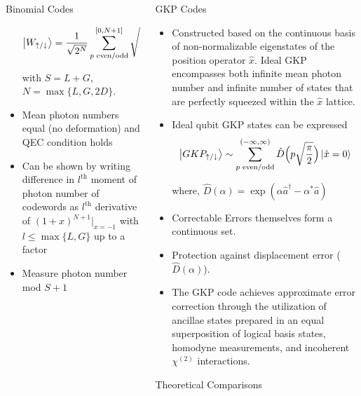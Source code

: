 \documentclass[8pt,final,hyperref={pdfpagelabels=false}]{beamer}
\theoremstyle{plain}
\newcommand\0{\mathbf{0}}
\begin{document}
\begin{frame}
\begin{columns}[t]
\begin{column}{.23\textwidth}
\begin{block}{Binomial Codes}
\begin{itemize}
$$
\ket{W_{\uparrow / \downarrow}} = \frac{1}{\sqrt{2^N}} \sum_{ p\text{ even/odd}}^{[0, N+1]} \sqrt{\binom{N+1}{ p }} \ket{p(S+1)}
$$

with $S = L+G$, $N = \max\{L, G, 2D\}$.
\item Mean photon numbers equal (no deformation) and QEC condition holds
\item Can be shown by writing difference in $l^\text{th}$ moment of photon number of codewords as $l^\text{th}$ derivative of $(1+x)^{N+1}\vert_{x=-1}$ with $l \leq \max\{L, G\}$ up to a factor
\item Measure photon number mod $S+1$
\end{itemize}
    \end{block}
\end{column}
\begin{column}{.23\textwidth} %
        \begin{block}{GKP Codes}
        \begin{itemize}
            \item Constructed based on the continuous basis of non-normalizable eigenstates of the position operator $\hat{x}$. Ideal GKP encompasses both infinite mean photon number and infinite number of states that are perfectly squeezed within the $\hat{x}$ lattice.
            \item Ideal qubit GKP states can be expressed $$\ket{GKP_{\uparrow/\downarrow}} \sim \sum_{p\text{ even/odd}}^{(-\infty, \infty)} \hat{D}\Big(p \sqrt{\frac{\pi}{2}} \Big) \ket{\hat{x} = 0}$$ 	

where,  $\hat{D}(\alpha) = \exp(\alpha \hat{a}^\dag - \alpha^* \hat{a})$
            \item Correctable Errors themselves form a continuous set. 
            \item Protection against displacement error ($\hat{D}(\alpha)$).
            \item The GKP code achieves approximate error correction through the utilization of ancillae states prepared in an equal superposition of logical basis states, homodyne measurements, and incoherent $\chi^{(2)}$ interactions.
        \end{itemize}
    \end{block}
    \begin{block}{Theoretical Comparisons}
        \begin{figure}
            

\end{figure}
\end{block}
\end{column}
\end{columns}
\end{frame}
\end{document}
